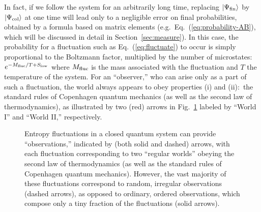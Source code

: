 \documentclass[12pt]{article}
\begin{document}
In fact, if we follow the system for an arbitrarily long time, replacing 
$\left| \Psi_{\rm fin} \right>$ by $\left| \Psi_{\rm col} \right>$ at one time will lead 
only to a negligible error on final probabilities, obtained by a formula 
based on matrix elements (e.g.\ Eq.~(\ref{eq:probability-AB}), which 
will be discussed in detail in Section~\ref{sec:measure}).  In this 
case, the probability for a fluctuation such as Eq.~(\ref{eq:fluctuate}) 
to occur is simply proportional to the Boltzmann factor, multiplied by 
the number of microstates:\ $e^{-M_{\rm fluc}/T + S_{\rm low}}$ where 
$M_{\rm fluc}$ is the mass associated with the fluctuation and $T$ 
the temperature of the system.  For an ``observer,'' who can arise 
only as a part of such a fluctuation, the world always appears to obey 
properties (i) and (ii):\ the standard rules of Copenhagen quantum 
mechanics (as well as the second law of thermodynamics), as illustrated 
by two (red) arrows in Fig.~\ref{fig:fluct} labeled by ``World I'' 
and ``World II,'' respectively.
%
\begin{figure}[t]
\caption{Entropy fluctuations in a closed quantum system can provide 
 ``observations,'' indicated by (both solid and dashed) arrows, with 
 each fluctuation corresponding to two ``regular worlds'' obeying the 
 second law of thermodynamics (as well as the standard rules of Copenhagen 
 quantum mechanics).  However, the vast majority of these fluctuations 
 correspond to random, irregular observations (dashed arrows), as 
 opposed to ordinary, ordered observations, which compose only a tiny 
 fraction of the fluctuations (solid arrows).}
\label{fig:fluct}
\end{figure}
%
\end{document}
